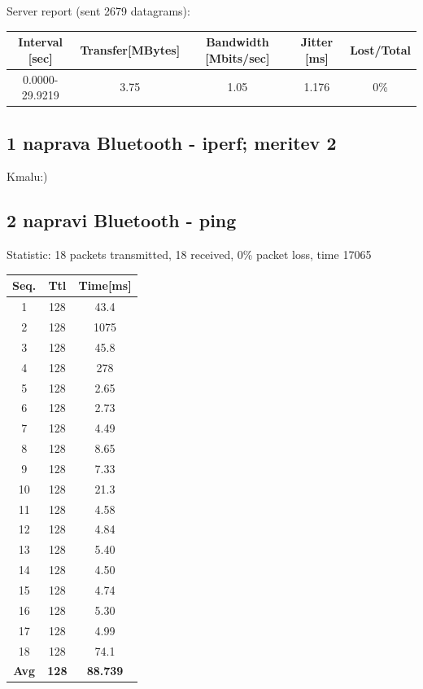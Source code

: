 \documentclass[11pt,a4paper,slovene]{article}
\begin{document}
Server report (sent 2679 datagrams):\\

\begin{table}[H]
	\begin{adjustwidth}{-3cm}{-3cm}
	\centering
		\begin{tabular}{c|c|c|c|c}
		\hline
		\textbf{Interval [sec]} & \textbf{Transfer[MBytes]} & \textbf{Bandwidth [Mbits/sec]} & \textbf{Jitter [ms]} & \textbf{Lost/Total}\\
     		\hline
     		0.0000-29.9219 & 3.75 & 1.05 & 1.176 & 0\%\\
  		\hline
    		\end{tabular}
    	\end{adjustwidth}
\end{table}

\subsection{1 naprava Bluetooth - iperf; meritev 2}

Kmalu:)\\

\subsection{2 napravi Bluetooth - ping}

Statistic: 18 packets transmitted, 18 received, 0\% packet loss, time 17065
 
\begin{table}[H]
	\begin{adjustwidth}{-3cm}{-3cm}
	\centering
		\begin{tabular}{c|c|c}
		\hline
		\textbf{Seq.} & \textbf{Ttl} & \textbf{Time[ms]}\\
     	\hline
     	1 & 128 & 43.4\\
  		2 & 128 & 1075\\
  		3 & 128 & 45.8\\
  		4 & 128 & 278\\
  		5 & 128 & 2.65\\
  		6 & 128 & 2.73\\
  		7 & 128 & 4.49\\
  		8 & 128 & 8.65\\
  		9 & 128 & 7.33\\
  		10 & 128 & 21.3\\
  		11 & 128 & 4.58\\
  		12 & 128 & 4.84\\
  		13 & 128 & 5.40\\
  		14 & 128 & 4.50\\
  		15 & 128 & 4.74\\
  		16 & 128 & 5.30\\
  		17 & 128 & 4.99\\
  		18 & 128 & 74.1\\
  		\hline
  		\textbf{Avg} & \textbf{128} & \textbf{88.739}\\
  		\hline
  		\end{tabular}
    	\end{adjustwidth}
\end{table}
\end{document}
